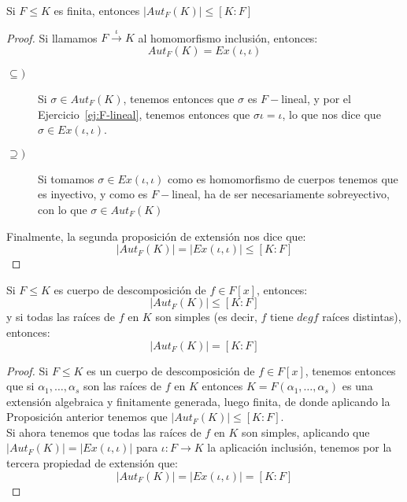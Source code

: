 \begin{prop}\label{prop:comienzo_chap_2}
    Si $F\leq K$ es finita, entonces $|Aut_F(K)| \leq [K:F]$
    \begin{proof}
        Si llamamos $F\stackrel{\iota}{\to}K$ al homomorfismo inclusión, entonces:
        \begin{equation*}
            Aut_F(K) = Ex(\iota, \iota)
        \end{equation*}
        \begin{description}
            \item [$\subseteq )$] Si $\sigma\in Aut_F(K)$, tenemos entonces que $\sigma$ es $F-$lineal, y por el Ejercicio~\ref{ej:F-lineal}, tenemos entonces que $\sigma\iota = \iota$, lo que nos dice que $\sigma\in Ex(\iota,\iota)$.
            \item [$\supseteq )$] Si tomamos $\sigma\in Ex(\iota,\iota)$ como es homomorfismo de cuerpos tenemos que es inyectivo, y como es $F-$lineal, ha de ser necesariamente sobreyectivo, con lo que $\sigma\in Aut_F(K)$
        \end{description}
        Finalmente, la segunda proposición de extensión nos dice que:
        \begin{equation*}
            |Aut_F(K)| = |Ex(\iota,\iota)| \leq [K:F]
        \end{equation*}
    \end{proof}
\end{prop}

\begin{prop}\label{prop:cuerpo_desc_aut_f_lin}
    Si $F\leq K$ es cuerpo de descomposición de $f\in F[x]$, entonces: 
    \begin{equation*}
        |Aut_F(K)| \leq [K:F]
    \end{equation*}
    y si todas las raíces de $f$ en $K$ son simples (es decir, $f$ tiene $degf$ raíces distintas), entonces:
    \begin{equation*}
        |Aut_F(K)| = [K:F]
    \end{equation*}
    \begin{proof}
        Si $F\leq K$ es un cuerpo de descomposición de $f\in F[x]$, tenemos entonces que si $\alpha_1, \ldots, \alpha_s$ son las raíces de $f$ en $K$ entonces $K = F(\alpha_1, \ldots, \alpha_s)$ es una extensión algebraica y finitamente generada, luego finita, de donde aplicando la Proposición anterior tenemos que $|Aut_F(K)|\leq [K:F]$.\\

        \noindent
        Si ahora tenemos que todas las raíces de $f$ en $K$ son simples, aplicando que $|Aut_F(K)| = |Ex(\iota,\iota)|$ para $\iota:F\to K$ la aplicación inclusión, tenemos por la tercera propiedad de extensión que:
        \begin{equation*}
            |Aut_F(K)| = |Ex(\iota,\iota)| = [K:F]
        \end{equation*}
    \end{proof}
\end{prop}

